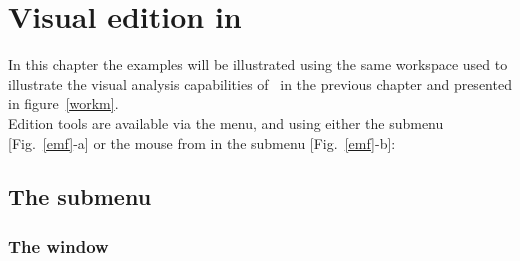 \chapter{Visual edition in \atomes}
\label{edition}

In this chapter the examples will be illustrated using the same workspace used to illustrate the visual analysis 
capabilities of \atomes\ in the previous chapter and presented in figure~\ref{workm}. \\
Edition tools are available via the  menu, and using either the  submenu [Fig.~\ref{emf}-a]
or the mouse  from in the  submenu [Fig.~\ref{emf}-b]: \\
\emfig

\section{The  submenu}

\subsection{The  window}

